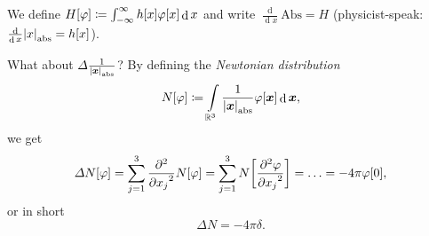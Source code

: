 \documentclass[10pt]{article}
\DeclarePairedDelimiter\singleBars{\lvert}{\rvert}
\DeclarePairedDelimiter\parentheses{\lparen}{\rparen}
\DeclarePairedDelimiter\squareBrackets{[}{]}
\DeclareMathOperator{\diffd}{d}
\newcommand\pderiv[3][]{\frac{\partial^{#1} #3}{{\partial {#2}}^{#1}}}
\newcommand{\R}{\mathbb{R}}
\newcommand\of[1]{\parentheses*{#1}}
\newcommand\abs[1]{\singleBars*{#1}}
\newcommand\gj\varphi
\newcommand{\vx}{{\vectorsym x}}
\renewcommand\of[1]{\squareBrackets*{#1}}
\renewcommand\abs[1]{\singleBars*{#1}_{\mathrm{abs}}}
\newcommand\Int[1]{\int\limits_{#1}}
\begin{document}
  We define $H\of\gj \coloneqq \int_{-\infty}^{\infty} h\of{x} \gj\of{x} \diffd{x}$ and write $\frac{\diffd}{\diffd{x}} \mathrm{Abs} = H$ (physicist-speak: $\frac{\diffd}{\diffd{x}} \abs{x} = h\of{x}$).

  What about $\Delta\frac{1}{\abs{\vx}}$? By defining the \emph{Newtonian distribution}
  \begin{equation*}
    N\of\gj \coloneqq \Int{\R^3} \frac{1}{\abs{\vx}} \gj\of\vx \diffd{\vx},
  \end{equation*}
  we get
  \begin{equation*}
    \Delta{N}\of\gj = \sum_{j = 1}^{3} \pderiv[2]{x_j}{} N\of\gj = \sum_{j = 1}^{3}  N\of{\pderiv[2]{x_j}\gj} = \ldots = -4 \pi \gj\of{0},
  \end{equation*}
  or in short
  \begin{equation*}
    \Delta N = -4 \pi \delta.
  \end{equation*}
\end{document}
